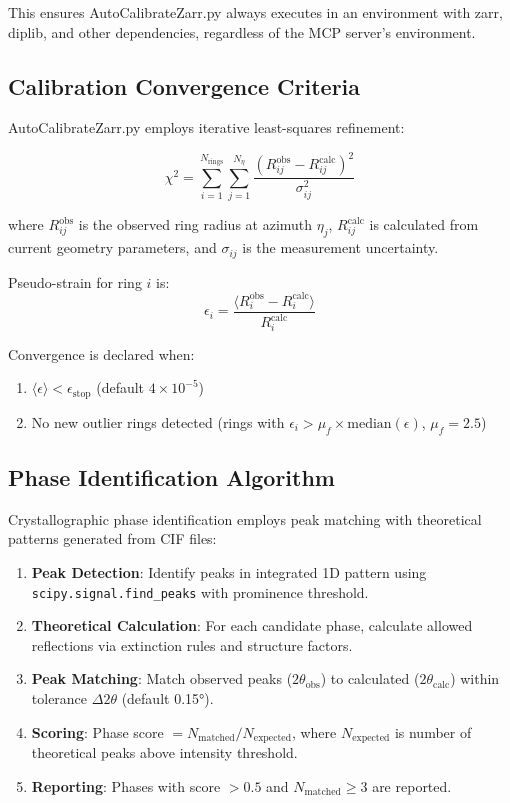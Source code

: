 \documentclass[11pt]{article}
\begin{document}
This ensures AutoCalibrateZarr.py always executes in an environment with zarr, diplib, and other dependencies, regardless of the MCP server's environment.

\subsection{Calibration Convergence Criteria}

AutoCalibrateZarr.py employs iterative least-squares refinement:

\begin{equation}
\chi^2 = \sum_{i=1}^{N_{\text{rings}}} \sum_{j=1}^{N_{\eta}} \frac{(R_{ij}^{\text{obs}} - R_{ij}^{\text{calc}})^2}{\sigma_{ij}^2}
\end{equation}

where $R_{ij}^{\text{obs}}$ is the observed ring radius at azimuth $\eta_j$, $R_{ij}^{\text{calc}}$ is calculated from current geometry parameters, and $\sigma_{ij}$ is the measurement uncertainty.

Pseudo-strain for ring $i$ is:
\begin{equation}
\epsilon_i = \frac{\langle R_i^{\text{obs}} - R_i^{\text{calc}} \rangle}{R_i^{\text{calc}}}
\end{equation}

Convergence is declared when:
\begin{enumerate}
    \item $\langle \epsilon \rangle < \epsilon_{\text{stop}}$ (default $4 \times 10^{-5}$)
    \item No new outlier rings detected (rings with $\epsilon_i > \mu_f \times \text{median}(\epsilon)$, $\mu_f = 2.5$)
\end{enumerate}

\subsection{Phase Identification Algorithm}

Crystallographic phase identification employs peak matching with theoretical patterns generated from CIF files:

\begin{enumerate}
    \item \textbf{Peak Detection}: Identify peaks in integrated 1D pattern using \texttt{scipy.signal.find\_peaks} with prominence threshold.
    \item \textbf{Theoretical Calculation}: For each candidate phase, calculate allowed reflections via extinction rules and structure factors.
    \item \textbf{Peak Matching}: Match observed peaks ($2\theta_{\text{obs}}$) to calculated ($2\theta_{\text{calc}}$) within tolerance $\Delta 2\theta$ (default 0.15°).
    \item \textbf{Scoring}: Phase score $= N_{\text{matched}} / N_{\text{expected}}$, where $N_{\text{expected}}$ is number of theoretical peaks above intensity threshold.
    \item \textbf{Reporting}: Phases with score $> 0.5$ and $N_{\text{matched}} \geq 3$ are reported.
\end{enumerate}
\end{document}
